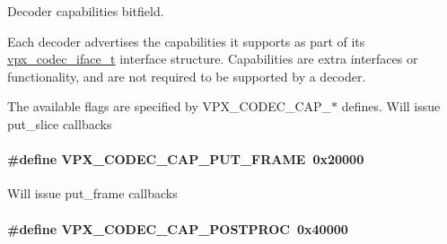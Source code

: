 \-Decoder capabilities bitfield. 

\-Each decoder advertises the capabilities it supports as part of its \hyperlink{group__codec_gad654f3da60151f5dfef70aca00ef1e9e}{vpx\-\_\-codec\-\_\-iface\-\_\-t} interface structure. \-Capabilities are extra interfaces or functionality, and are not required to be supported by a decoder.

\-The available flags are specified by \-V\-P\-X\-\_\-\-C\-O\-D\-E\-C\-\_\-\-C\-A\-P\-\_\-$\ast$ defines. \-Will issue put\-\_\-slice callbacks \hypertarget{group__decoder_ga0ef59ca8067ac1dc8c8378042277ccc8}{
\paragraph[{\-V\-P\-X\-\_\-\-C\-O\-D\-E\-C\-\_\-\-C\-A\-P\-\_\-\-P\-U\-T\-\_\-\-F\-R\-A\-M\-E}]{\setlength{\rightskip}{0pt plus 5cm}\#define {\bf \-V\-P\-X\-\_\-\-C\-O\-D\-E\-C\-\_\-\-C\-A\-P\-\_\-\-P\-U\-T\-\_\-\-F\-R\-A\-M\-E}~0x20000}}\label{group__decoder_ga0ef59ca8067ac1dc8c8378042277ccc8}
\-Will issue put\-\_\-frame callbacks \hypertarget{group__decoder_ga7825ade982ab85a5583d3d8a669baa3b}{
\paragraph[{\-V\-P\-X\-\_\-\-C\-O\-D\-E\-C\-\_\-\-C\-A\-P\-\_\-\-P\-O\-S\-T\-P\-R\-O\-C}]{\setlength{\rightskip}{0pt plus 5cm}\#define {\bf \-V\-P\-X\-\_\-\-C\-O\-D\-E\-C\-\_\-\-C\-A\-P\-\_\-\-P\-O\-S\-T\-P\-R\-O\-C}~0x40000}}\label{group__decoder_ga7825ade982ab85a5583d3d8a669baa3b}
